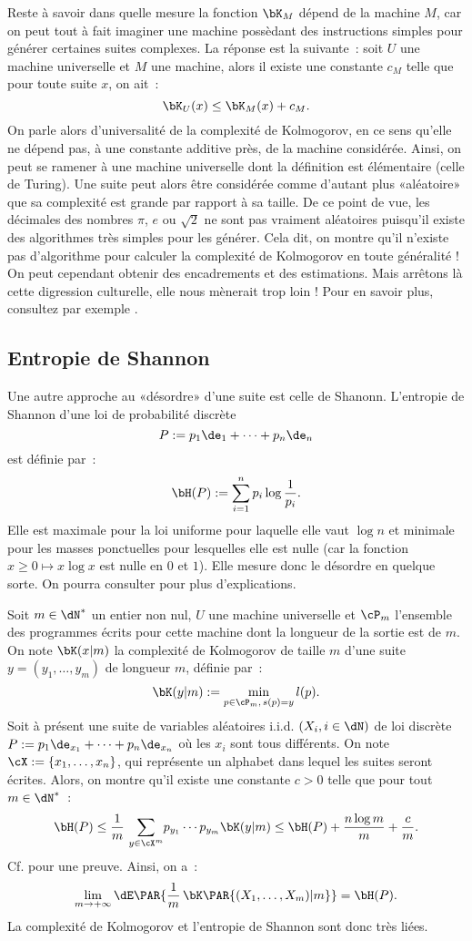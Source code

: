 Reste à savoir dans quelle mesure la fonction $\bK_M$ dépend de la machine
$M$, car on peut tout à fait imaginer une machine possèdant des instructions
simples pour générer certaines suites complexes. La réponse est la suivante~:
soit $U$ une machine universelle et $M$ une machine, alors il existe une
constante $c_M$ telle que pour toute suite $x$, on ait~:
$$
\bK_U(x) \leq \bK_M(x)+c_M.
$$
On parle alors d'universalité de la complexité de Kolmogorov, en ce sens
qu'elle ne dépend pas, à une constante additive près, de la machine
considérée. Ainsi, on peut se ramener à une machine universelle dont la
définition est élémentaire (celle de Turing). Une suite peut alors être
considérée comme d'autant plus «aléatoire» que sa complexité est grande par
rapport à sa taille. De ce point de vue, les décimales des nombres $\pi$, $e$ ou
$\sqrt{2}$ ne sont pas vraiment aléatoires puisqu'il existe des algorithmes
très simples pour les générer. Cela dit, on montre qu'il n'existe pas
d'algorithme pour calculer la complexité de Kolmogorov en toute généralité !
On peut cependant obtenir des encadrements et des estimations. Mais arrêtons
là cette digression culturelle, elle nous mènerait trop loin ! Pour en savoir
plus, consultez par exemple \cite[chap. 7]{cover-thomas}.

\subsection{Entropie de Shannon}\label{ss:shannon}

Une autre approche au «désordre» d'une suite est celle de Shanonn. L'entropie
de Shannon d'une loi de probabilité discrète 
$$P:=p_1\de_1+\cdots+p_n\de_n$$
est définie par~:
$$
\bH(P):=\sum_{i=1}^n p_i\log \frac{1}{p_i}.
$$
Elle est maximale pour la loi uniforme pour laquelle elle vaut $\log n$ et
minimale pour les masses ponctuelles pour lesquelles elle est nulle (car la
fonction $x\geq 0\mapsto x\log x$ est nulle en $0$ et $1$). Elle mesure donc
le désordre en quelque sorte. On pourra consulter \cite[chap. 6]{applebaum}
pour plus d'explications.

Soit $m\in\dN^*$ un entier non nul, $U$ une machine universelle et $\cP_m$
l'ensemble des programmes écrits pour cette machine dont la longueur de la
sortie est de $m$. On note $\bK(x|m)$ la complexité de Kolmogorov de taille
$m$ d'une suite $y=(y_1,\ldots,y_m)$ de longueur $m$, définie par~:
$$
\bK(y|m):=\min_{p\in\cP_m,\,s(p)=y} l(p).
$$
Soit à présent une suite de variables aléatoires i.i.d. $(X_i,i\in\dN)$ de
loi discrète $P:=p_1\de_{x_1}+\cdots+p_n\de_{x_n}$ où les $x_i$ sont tous
différents. On note $\cX:=\{x_1,\ldots,x_n\}$, qui représente un alphabet dans lequel
les suites seront écrites. Alors, on montre qu'il existe une constante $c>0$
telle que pour tout $m\in\dN^*$~:
$$
\bH(P) \leq\frac{1}{m}\,\sum_{y\in\cX^m}\! p_{y_1}\cdots p_{y_m} \bK(y|m)
\leq\bH(P)+\frac{n\log m}{m}+\frac{c}{m}.
$$
Cf. \cite[théorème 7.3.1 page 154]{cover-thomas} pour une preuve. Ainsi, on
a~:
$$
\lim_{m\to+\infty}\dE\PAR{\frac{1}{m}\,\bK\PAR{(X_1,\ldots,X_m)|m}}=\bH(P).
$$
La complexité de Kolmogorov et l'entropie de Shannon sont donc très liées.


